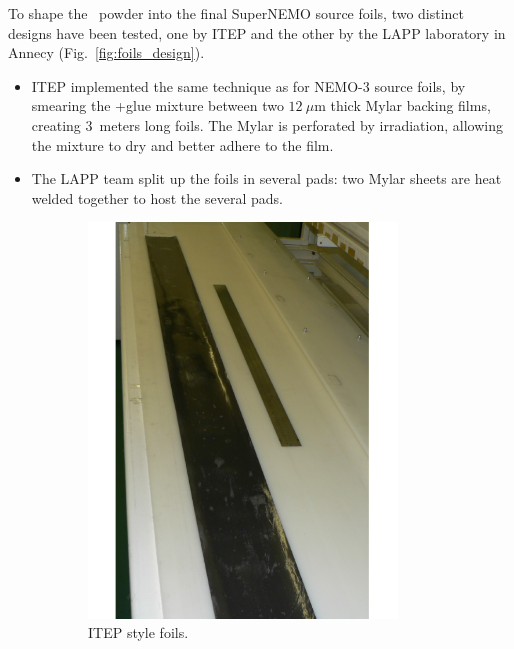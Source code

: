 To shape the \Se\ powder into the final SuperNEMO source foils, two distinct designs have been tested, one by ITEP and the other by the LAPP laboratory in Annecy (Fig.~\ref{fig:foils_design}).
\begin{itemize}
\item ITEP implemented the same technique as for NEMO-$3$ source foils, by smearing the \Se+glue mixture between two $12~\mu$m thick Mylar backing films, creating $3$~meters long foils.
The Mylar is perforated by irradiation, allowing the mixture to dry and better adhere to the film.
\item The LAPP team split up the foils in several pads: two Mylar sheets are heat welded together to host the several pads.
\end{itemize}
\begin{figure}[h!]
\centering
\begin{subfigure}[t]{0.49\textwidth}
\centering
\includegraphics[width=0.9\textwidth]{SNdemonstrator/fig_SNdemonstrator/ITEP_source_foils.png}
\captionsetup{justification=centering}
\caption{ITEP style foils.
\label{subfig:ITEP_foils}}
\end{subfigure}
\hfill
\begin{subfigure}[t]{0.49\textwidth}

\end{subfigure}
\end{figure}
